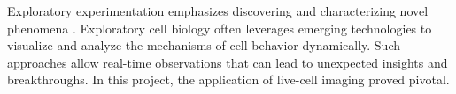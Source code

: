 


%
\label{sec:summarising_discussion}%
% 
%
\label{sec:discussion_potential_breakthroughs}%
Exploratory experimentation emphasizes discovering and characterizing novel
phenomena \cite{mattigClassifyingExploratoryExperimentation2022}. Exploratory
cell biology often leverages emerging technologies to visualize and analyze the
mechanisms of cell behavior dynamically. Such approaches allow real-time
observations that can lead to unexpected insights and breakthroughs. In this
project, the application of live-cell imaging proved pivotal.

